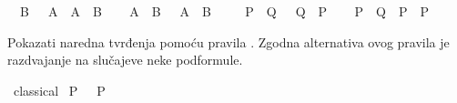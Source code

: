 \begin{isabellebody}
\begin{exercise}[subtitle=Klasična pravilo prirodne dedukcije: ccontr.]
\ {\isachardoublequoteopen}{\isacharparenleft}{\kern0pt}{\isasymnot}\ B\ {\isasymlongrightarrow}\ {\isasymnot}\ A{\isacharparenright}{\kern0pt}\ {\isasymlongrightarrow}\ {\isacharparenleft}{\kern0pt}A\ {\isasymlongrightarrow}\ B{\isacharparenright}{\kern0pt}{\isachardoublequoteclose}\isanewline
\ \ %
\isadelimproof
%
\endisadelimproof
%
\isatagproof
%
\endisatagproof
{\isafoldproof}%
%
\isadelimproof
%
\endisadelimproof
\isanewline
{}\isamarkupfalse%
\ {\isachardoublequoteopen}{\isacharparenleft}{\kern0pt}A\ {\isasymlongrightarrow}\ B{\isacharparenright}{\kern0pt}\ {\isasymlongrightarrow}\ {\isacharparenleft}{\kern0pt}{\isasymnot}\ A\ {\isasymor}\ B{\isacharparenright}{\kern0pt}{\isachardoublequoteclose}\isanewline
\ \ %
\isadelimproof
%
\endisadelimproof
%
\isatagproof
%
\endisatagproof
{\isafoldproof}%
%
\isadelimproof
%
\endisadelimproof
\isanewline
{}\isamarkupfalse%
\ {\isachardoublequoteopen}{\isacharparenleft}{\kern0pt}{\isasymnot}\ P\ {\isasymlongrightarrow}\ Q{\isacharparenright}{\kern0pt}\ {\isasymlongleftrightarrow}\ {\isacharparenleft}{\kern0pt}{\isasymnot}\ Q\ {\isasymlongrightarrow}\ P{\isacharparenright}{\kern0pt}{\isachardoublequoteclose}\isanewline
\ \ %
\isadelimproof
%
\endisadelimproof
%
\isatagproof
%
\endisatagproof
{\isafoldproof}%
%
\isadelimproof
%
\endisadelimproof
\isanewline
{}\isamarkupfalse%
\ {\isachardoublequoteopen}{\isacharparenleft}{\kern0pt}{\isacharparenleft}{\kern0pt}P\ {\isasymlongrightarrow}\ Q{\isacharparenright}{\kern0pt}\ {\isasymlongrightarrow}\ P{\isacharparenright}{\kern0pt}\ {\isasymlongrightarrow}\ P{\isachardoublequoteclose}\isanewline
\ \ %
\isadelimproof
%
\endisadelimproof
%
\isatagproof
%
\endisatagproof
{\isafoldproof}%
%
\isadelimproof
%
\endisadelimproof
%
\end{exercise}
%
\begin{exercise}[subtitle=Klasična pravilo prirodne dedukcije: classical.]
%
\begin{isamarkuptext}%
Pokazati naredna tvrđenja pomoću pravila . Zgodna alternativa ovog pravila je 
      razdvajanje na slučajeve neke podformule.%
\end{isamarkuptext}\isamarkuptrue%
\isamarkupfalse%
\ classical\isanewline
\isanewline
{}\isamarkupfalse%
\ {\isachardoublequoteopen}P\ {\isasymor}\ {\isasymnot}\ P{\isachardoublequoteclose}\isanewline
\ \ %
\isadelimproof
%
\endisadelimproof
%
\isatagproof
%
\endisatagproof
{\isafoldproof}%
%
\isadelimproof
%
\endisadelimproof
\isanewline
{}\isamarkupfalse%

\end{exercise}
\end{isabellebody}
